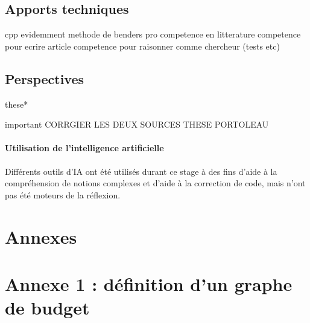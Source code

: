 \documentclass[12pt, a4paper, twoside]{article}
\numberwithin{equation}{section}
\begin{document}
	
	\subsection{Apports techniques}
	cpp evidemment
    methode de benders
    pro
    competence en litterature
    competence pour ecrire article
    competence pour raisonner comme chercheur (tests etc)
    
	\subsection{Perspectives}

    these*


    important CORRGIER LES DEUX SOURCES THESE PORTOLEAU
    
    
	\vfill{}
	\paragraph{Utilisation de l'intelligence artificielle} Différents outils d'IA ont été utilisés durant ce stage à des fins d'aide à la compréhension de notions complexes et d'aide à la correction de code, mais n'ont pas été moteurs de la réflexion. 
	
	\printbibliography
	
	\clearpage
	\section*{Annexes}

    \appendix
    
    \begingroup
        
        \localtableofcontents
    \endgroup


    \clearpage
    \section{Annexe 1 : définition d'un graphe de budget}
    \label{section:annexe:def:graphe_budget}
    
\end{document}

